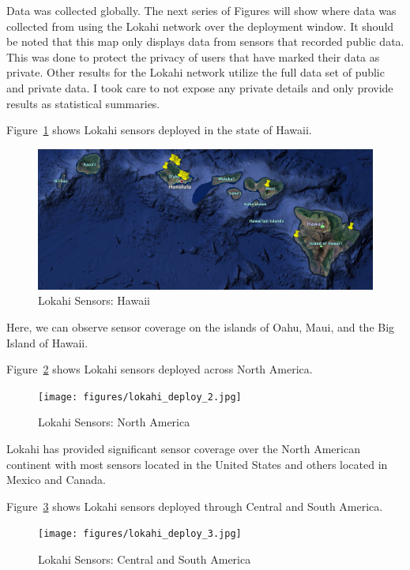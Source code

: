 Data was collected globally. The next series of Figures will show where data was collected from using the Lokahi network over the deployment window. It should be noted that this map only displays data from sensors that recorded public data. This was done to protect the privacy of users that have marked their data as private. Other results for the Lokahi network utilize the full data set of public and private data. I took care to not expose any private details and only provide results as statistical summaries.

Figure~\ref{fig:lokahi_deploy_1} shows Lokahi sensors deployed in the state of Hawaii.

\begin{figure}[H]
	\centering
	\includegraphics[width=\linewidth]{figures/lokahi_deploy_1.jpg}
	\caption{Lokahi Sensors: Hawaii}
	\label{fig:lokahi_deploy_1}
\end{figure}

Here, we can observe sensor coverage on the islands of Oahu, Maui, and the Big Island of Hawaii.

Figure~\ref{fig:lokahi_deploy_2} shows Lokahi sensors deployed across North America.

\begin{figure}[H]
	\centering
	\texttt{[image: figures/lokahi\_deploy\_2.jpg]}
	\caption{Lokahi Sensors: North America}
	\label{fig:lokahi_deploy_2}
\end{figure}

Lokahi has provided significant sensor coverage over the North American continent with most sensors located in the United States and others located in Mexico and Canada.

Figure~\ref{fig:lokahi_deploy_3} shows Lokahi sensors deployed through Central and South America.

\begin{figure}[H]
	\centering
	\texttt{[image: figures/lokahi\_deploy\_3.jpg]}
	\caption{Lokahi Sensors: Central and South America}
	\label{fig:lokahi_deploy_3}
\end{figure}

